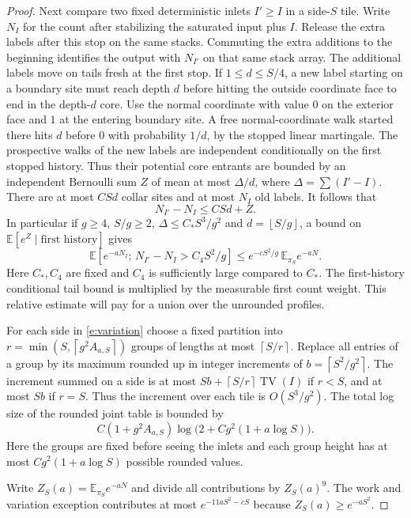 \documentclass[11pt]{amsart}
\newcommand{\E}{\mathbb E}
\newcommand{\1}{\mathbf 1}
\newcommand{\TV}{\operatorname{TV}}
\newcommand{\floor}[1]{\left\lfloor #1\right\rfloor}
\newcommand{\ceil}[1]{\left\lceil #1\right\rceil}
\begin{document}
\begin{proof}
Next compare two fixed deterministic inlets \(I'\ge I\) in a side-\(S\) tile. Write \(N_I\) for the count after stabilizing the saturated input plus \(I\). Release the extra labels after this stop on the same stacks. Commuting the extra additions to the beginning identifies the output with \(N_{I'}\) on that same stack array. The additional labels move on tails fresh at the first stop. If \(1\le d\le S/4\), a new label starting on a boundary site must reach depth \(d\) before hitting the outside coordinate face to end in the depth-\(d\) core. Use the normal coordinate with value \(0\) on the exterior face and \(1\) at the entering boundary site. A free normal-coordinate walk started there hits \(d\) before \(0\) with probability \(1/d\), by the stopped linear martingale. The prospective walks of the new labels are independent conditionally on the first stopped history. Thus their potential core entrants are bounded by an independent Bernoulli sum \(Z\) of mean at most \(\Delta/d\), where \(\Delta=\sum(I'-I)\). There are at most \(CSd\) collar sites and at most \(N_I\) old labels. It follows that
\begin{equation}\label{e:top}
 N_{I'}-N_I\le CSd+Z .
\end{equation}
In particular if \(g\ge4\), \(S/g\ge2\), \(\Delta\le C_*S^3/g^2\) and \(d=\floor{S/g}\), a bound on \(\E[e^Z\mid\text{first history}]\) gives
\begin{equation}\label{e:weighted}
 \E[e^{-aN_I};\,N_{I'}-N_I>C_4S^2/g]
       \le e^{-cS^2/g}\,\E_{\pi_S}e^{-aN}.
\end{equation}
Here \(C_*,C_4\) are fixed and \(C_4\) is sufficiently large compared to \(C_*\). The first-history conditional tail bound is multiplied by the measurable first count weight. This relative estimate will pay for a union over the unrounded profiles.

For each side in \eqref{e:variation} choose a fixed partition into \(r=\min(S,\ceil{g^2 A_{a,S}})\) groups of lengths at most \(\ceil{S/r}\). Replace all entries of a group by its maximum rounded up in integer increments of \(b=\ceil{S^2/g^2}\). The increment summed on a side is at most \(Sb+\ceil{S/r}\TV(I)\) if \(r<S\), and at most \(Sb\) if \(r=S\). Thus the increment over each tile is \(O(S^3/g^2)\). The total log size of the rounded joint table is bounded by
\[
 C(1+g^2 A_{a,S})\log\!\big(2+Cg^2(1+a\log S)\big).
\]
Here the groups are fixed before seeing the inlets and each group height has at most \(Cg^2(1+a\log S)\) possible rounded values.

Write \(Z_S(a)=\E_{\pi_S}e^{-aN}\) and divide all contributions by \(Z_S(a)^9\). The work and variation exception contributes at most \(e^{-11aS^2-cS}\) because \(Z_S(a)\ge e^{-aS^2}\).


\end{proof}
\end{document}
